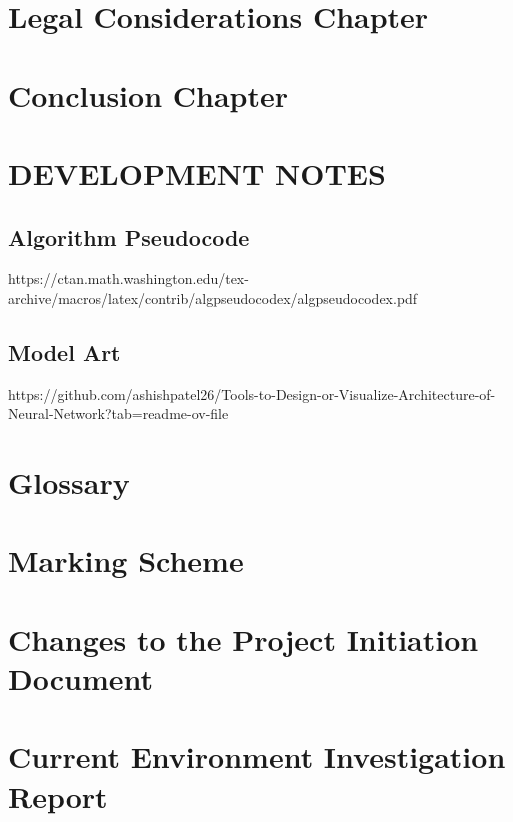 \documentclass[preprint,11pt,review,authoryear]{elsarticle}
\begin{document}
\section{Legal Considerations Chapter}

\section{Conclusion Chapter}




\section{DEVELOPMENT NOTES}

\subsection{Algorithm Pseudocode}
https://ctan.math.washington.edu/tex-archive/macros/latex/contrib/algpseudocodex/algpseudocodex.pdf

\subsection{Model Art}
https://github.com/ashishpatel26/Tools-to-Design-or-Visualize-Architecture-of-Neural-Network?tab=readme-ov-file

\newpage
\onecolumn
\section{Glossary}
\renewcommand{\thepage}{A\arabic{page}}
\newpage
\section{Marking Scheme}
\renewcommand{\thepage}{B\arabic{page}}
\newpage
\section{Changes to the Project Initiation Document}
\renewcommand{\thepage}{C\arabic{page}}
\newpage
\section{Current Environment Investigation Report}
\renewcommand{\thepage}{D\arabic{page}}
\newpage
\end{document}
